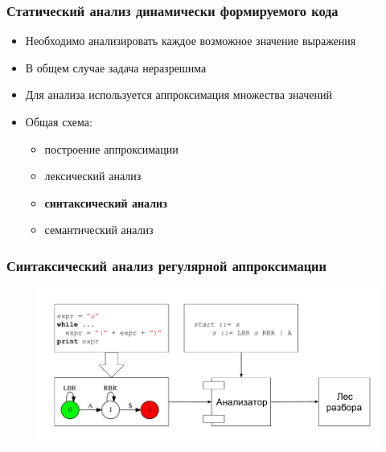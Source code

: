 \documentclass{beamer}
\begin{document}
\begin{frame}[fragile]
	\transwipe[direction=90]
	\frametitle{Статический анализ динамически формируемого кода} 
	\begin{itemize}
		\item Необходимо анализировать каждое возможное значение выражения
		\item В общем случае задача неразрешима 
		\item Для анализа используется аппроксимация множества значений
	\end{itemize}
	
	\pause
	\begin{itemize}
		\item Общая схема:
		\begin{itemize}
			\item построение аппроксимации
			\item лексический анализ
			\item \textbf{синтаксический анализ}
			\item семантический анализ
		\end{itemize}
	\end{itemize}
\end{frame}

\begin{frame}[fragile]
	\transwipe[direction=90]
	\frametitle{Синтаксический анализ регулярной аппроксимации}
	\begin{figure}
		\centering
		\includegraphics[width=12cm]{pictures/scheme_full.pdf}
	\end{figure}
	\pause
	\vspace{-15pt}
\end{frame}
\end{document}
